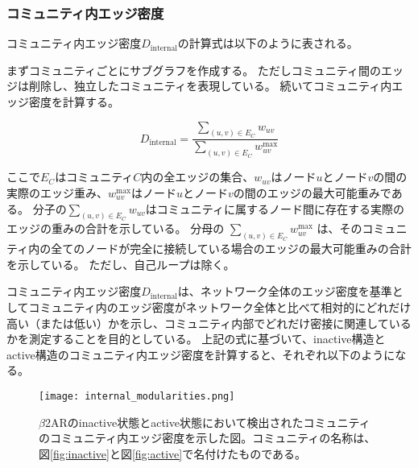 \subsubsection{コミュニティ内エッジ密度}
コミュニティ内エッジ密度$D_{\text{internal}}$の計算式は以下のように表される。

まずコミュニティごとにサブグラフを作成する。
ただしコミュニティ間のエッジは削除し、独立したコミュニティを表現している。
続いてコミュニティ内エッジ密度を計算する。

\[
D_{\text{internal}} = \frac{\sum_{(u,v) \in E_C} w_{uv}}{\sum_{(u,v) \in E_C} w_{uv}^{\text{max}}}
\label{eq:internal_density}
\]

ここで$E_C$はコミュニティ$C$内の全エッジの集合、$w_{uv}$はノード$u$とノード$v$の間の実際のエッジ重み、$w_{uv}^{\text{max}}$はノード$u$とノード$v$の間のエッジの最大可能重みである。
分子の\(\sum_{(u,v) \in E_C} w_{uv}\)はコミュニティに属するノード間に存在する実際のエッジの重みの合計を示している。
分母の \(\sum_{(u,v) \in E_C} w_{uv}^{\text{max}}\) は、そのコミュニティ内の全てのノードが完全に接続している場合のエッジの最大可能重みの合計を示している。
ただし、自己ループは除く。



コミュニティ内エッジ密度$D_{\text{internal}}$は、ネットワーク全体のエッジ密度を基準としてコミュニティ内のエッジ密度がネットワーク全体と比べて相対的にどれだけ高い（または低い）かを示し、コミュニティ内部でどれだけ密接に関連しているかを測定することを目的としている。
上記の式に基づいて、inactive構造とactive構造のコミュニティ内エッジ密度を計算すると、それぞれ以下のようになる。

\begin{figure}[htbp]
    \centering
    \texttt{[image: internal\_modularities.png]}
    \caption{$\beta$2ARのinactive状態とactive状態において検出されたコミュニティのコミュニティ内エッジ密度を示した図。コミュニティの名称は、図\ref{fig:inactive}と図\ref{fig:active}で名付けたものである。}
    \label{fig:internal}
\end{figure}

